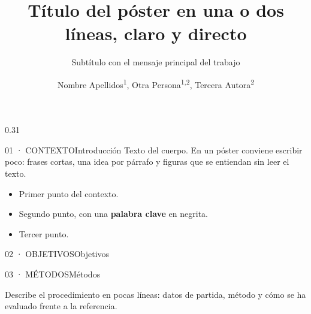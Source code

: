 \documentclass{article}
\title{Título del póster en una o dos líneas, claro y directo}
\subtitle{Subtítulo con el mensaje principal del trabajo}
\author{Nombre Apellidos\textsuperscript{1}, Otra Persona\textsuperscript{1,2}, Tercera Autora\textsuperscript{2}}
\begin{document}
\ubcdposterheader

\begin{ubcdcolumn}{0.31}
  \begin{ubcdblock}{01 · CONTEXTO}{Introducción}
    \vspace{24pt}
    Texto del cuerpo. En un póster conviene escribir poco: frases cortas,
    una idea por párrafo y figuras que se entiendan sin leer el texto.
    \begin{itemize}
      \item Primer punto del contexto.
      \item Segundo punto, con una \textbf{palabra clave} en negrita.
      \item Tercer punto.
    \end{itemize}
  \end{ubcdblock}

  \begin{ubcdblock}{02 · OBJETIVOS}{Objetivos}
    \begin{ubcdrows}
    \end{ubcdrows}
  \end{ubcdblock}

  \begin{ubcdblock}{03 · MÉTODOS}{Métodos}
    \ubcdarrow
    \ubcdarrow
    \par
    \vspace{28pt}
    Describe el procedimiento en pocas líneas: datos de partida, método y
    cómo se ha evaluado frente a la referencia.
  \end{ubcdblock}
\end{ubcdcolumn}\hfill
\end{document}
